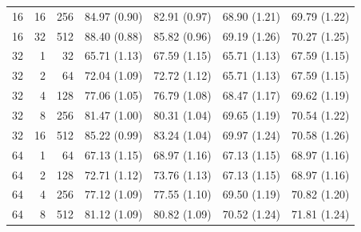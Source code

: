 \documentclass[11pt,letterpaper]{article}
\begin{document}
\begin{table}[!htbp]
\begin{tabular}{@{}rrr rrrr@{}}
16 & 16 & 256 & 84.97 {\scriptsize (0.90)} & 82.91 {\scriptsize (0.97)} & 68.90 {\scriptsize (1.21)} & 69.79 {\scriptsize (1.22)} \\
16 & 32 & 512 & 88.40 {\scriptsize (0.88)} & 85.82 {\scriptsize (0.96)} & 69.19 {\scriptsize (1.26)} & 70.27 {\scriptsize (1.25)} \\
\midrule
32 & 1 & 32 & 65.71 {\scriptsize (1.13)} & 67.59 {\scriptsize (1.15)} & 65.71 {\scriptsize (1.13)} & 67.59 {\scriptsize (1.15)} \\
32 & 2 & 64 & 72.04 {\scriptsize (1.09)} & 72.72 {\scriptsize (1.12)} & 65.71 {\scriptsize (1.13)} & 67.59 {\scriptsize (1.15)} \\
32 & 4 & 128 & 77.06 {\scriptsize (1.05)} & 76.79 {\scriptsize (1.08)} & 68.47 {\scriptsize (1.17)} & 69.62 {\scriptsize (1.19)} \\
32 & 8 & 256 & 81.47 {\scriptsize (1.00)} & 80.31 {\scriptsize (1.04)} & 69.65 {\scriptsize (1.19)} & 70.54 {\scriptsize (1.22)} \\
32 & 16 & 512 & 85.22 {\scriptsize (0.99)} & 83.24 {\scriptsize (1.04)} & 69.97 {\scriptsize (1.24)} & 70.58 {\scriptsize (1.26)} \\
\midrule
64 & 1 & 64 & 67.13 {\scriptsize (1.15)} & 68.97 {\scriptsize (1.16)} & 67.13 {\scriptsize (1.15)} & 68.97 {\scriptsize (1.16)} \\
64 & 2 & 128 & 72.71 {\scriptsize (1.12)} & 73.76 {\scriptsize (1.13)} & 67.13 {\scriptsize (1.15)} & 68.97 {\scriptsize (1.16)} \\
64 & 4 & 256 & 77.12 {\scriptsize (1.09)} & 77.55 {\scriptsize (1.10)} & 69.50 {\scriptsize (1.19)} & 70.82 {\scriptsize (1.20)} \\
64 & 8 & 512 & 81.12 {\scriptsize (1.09)} & 80.82 {\scriptsize (1.09)} & 70.52 {\scriptsize (1.24)} & 71.81 {\scriptsize (1.24)} \\
\bottomrule
\end{tabular}
\end{table}
\end{document}
